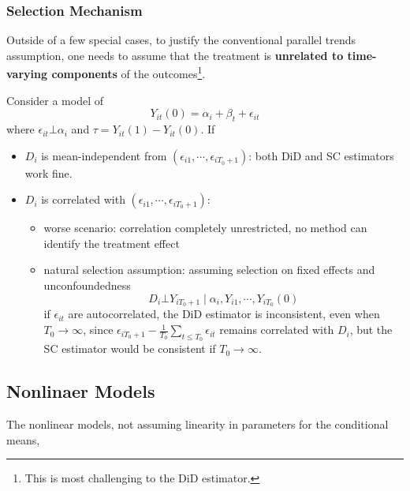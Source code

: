 \documentclass[twoside]{article}
\begin{document}
\subsubsection{Selection Mechanism}
Outside of a few special cases, to justify the conventional parallel trends assumption, one needs to assume that the treatment is \textbf{unrelated to time-varying components} of the outcomes\footnote{This is most challenging to the DiD estimator.}.

Consider a model of $$ Y_{it}(0) = \alpha_i + \beta_t + \epsilon_{it} $$ where $\epsilon_{it}\bot \alpha_i$ and $\tau=Y_{it}(1)-Y_{it}(0)$. If
\begin{itemize}
    \item $D_i$ is mean-independent from $\left(\epsilon_{i1},\cdots,\epsilon_{iT_0+1}\right)$: both DiD and SC estimators work fine.
    \item $D_i$ is correlated with $\left(\epsilon_{i1},\cdots,\epsilon_{iT_0+1}\right)$:
    \begin{itemize}
        \item worse scenario: correlation completely unrestricted, no method can identify the treatment effect 
        \item natural selection assumption: assuming selection on fixed effects and unconfoundedness $$ D_i\bot Y_{iT_0+1}\mid \alpha_i,Y_{i1},\cdots,Y_{iT_0}(0) $$
        if $\epsilon_{it}$ are autocorrelated, the DiD estimator is inconsistent, even when $T_0\rightarrow\infty$, since $\epsilon_{iT_0+1}-\frac{1}{T_0}\sum_{t\leq T_0}\epsilon_{it}$ remains correlated with $D_i$, but the SC estimator would be consistent if $T_0\rightarrow\infty$.
    \end{itemize}
\end{itemize} 

\subsection{Nonlinaer Models}
The nonlinear models, not assuming linearity in parameters for the conditional means, 

\newpage


\end{document}
